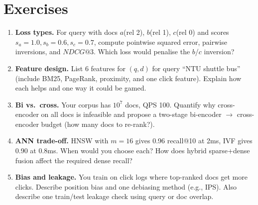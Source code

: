 \section{Exercises}
\begin{enumerate}[label=E8.\arabic*, leftmargin=*, itemsep=0.6em]
  \item \textbf{Loss types.} For query with docs $a$(rel 2), $b$(rel 1), $c$(rel 0) and scores $s_a=1.0,s_b=0.6,s_c=0.7$, compute pointwise squared error, pairwise inversions, and $NDCG@3$. Which loss would penalise the $b$/$c$ inversion?
  \item \textbf{Feature design.} List 6 features for $(q,d)$ for query ``NTU shuttle bus'' (include BM25, PageRank, proximity, and one click feature). Explain how each helps and one way it could be gamed.
  \item \textbf{Bi vs.\ cross.} Your corpus has $10^7$ docs, QPS 100. Quantify why cross-encoder on all docs is infeasible and propose a two-stage bi-encoder $\to$ cross-encoder budget (how many docs to re-rank?).
  \item \textbf{ANN trade-off.} HNSW with $m=16$ gives 0.96 recall@10 at 2ms, IVF gives 0.90 at 0.8ms. When would you choose each? How does hybrid sparse+dense fusion affect the required dense recall?
  \item \textbf{Bias and leakage.} You train on click logs where top-ranked docs get more clicks. Describe position bias and one debiasing method (e.g., IPS). Also describe one train/test leakage check using query or doc overlap.
\end{enumerate}

